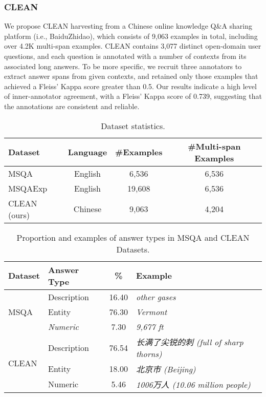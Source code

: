 \documentclass[a4paper]{cas-sc}
\newcommand{\1}[1]{\mathds{1}\left[#1\right]}
\begin{document}
\subsubsection*{CLEAN}
We propose CLEAN harvesting from a Chinese online knowledge Q\&A sharing platform (i.e., BaiduZhidao), 
which consists of 9,063 examples in total, including over 4.2K multi-span examples. 
CLEAN contains 3,077 distinct open-domain user questions, and each question is annotated with a number of contexts from its associated long answers. To be more specific, we recruit three annotators to extract answer spans from given contexts, and retained only those examples that achieved a Fleiss' Kappa score greater than 0.5. Our results indicate a high level of inner-annotator agreement, with a Fleiss' Kappa score of 0.739, suggesting that the annotations are consistent and reliable.


\begin{table}[width=.7\textwidth,cols=4,pos=h]
	\caption{Dataset statistics.}
	\label{tab:datasets}
	\begin{tabular*}{\tblwidth}{lccc}
		\toprule
		Dataset 
		& Language &  \#Examples & \#Multi-span Examples \\
		\hline
		MSQA~\cite{li2022multispanqa}
		&  English  & 6,536   & 6,536  \\
		MSQAExp~\cite{li2022multispanqa}
		&  English  & 19,608   & 6,536  \\
		CLEAN (ours)
		& Chinese &  9,063  & 4,204  \\
		\bottomrule
	\end{tabular*}
\end{table}

\begin{table}[width=.7\textwidth,cols=4,pos=h]
	\caption{Proportion and examples of answer types in MSQA and CLEAN Datasets.}
	\label{tab:answer_types}
	\begin{tabular*}{\tblwidth}{llcp{8cm}}
		\toprule
		\textbf{Dataset} & \textbf{Answer Type} & \textbf{\%} & \textbf{Example} \\
		\midrule
		\multirow{3}{*}{MSQA} & Description & 16.40 & \emph{other gases} \\
		& Entity & 76.30 & \emph{Vermont} \\
		& \emph{Numeric} & 7.30 & \emph{9,677 ft} \\
		\midrule
		\multirow{3}{*}{CLEAN} & Description & 76.54 & \emph{长满了尖锐的刺 (full of sharp thorns)} \\
		& Entity & 18.00 & \emph{北京市 (Beijing)}  \\
		& Numeric & 5.46 & \emph{1006万人 (10.06 million people)} \\
		\bottomrule
	\end{tabular*}
\end{table}
\end{document}
